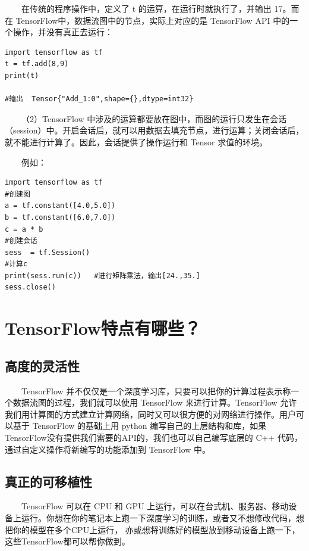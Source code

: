   在传统的程序操作中，定义了 t 的运算，在运行时就执行了，并输出 17。而在
TensorFlow中，数据流图中的节点，实际上对应的是 TensorFlow API
中的一个操作，并没有真正去运行：

\begin{verbatim}
import tensorflow as tf
t = tf.add(8,9)
print(t)

#输出  Tensor{"Add_1:0",shape={},dtype=int32}
\end{verbatim}

  （2）TensorFlow
中涉及的运算都要放在图中，而图的运行只发生在会话（session）中。开启会话后，就可以用数据去填充节点，进行运算；关闭会话后，就不能进行计算了。因此，会话提供了操作运行和
Tensor 求值的环境。

　　例如：

\begin{verbatim}
import tensorflow as tf
#创建图
a = tf.constant([4.0,5.0])
b = tf.constant([6.0,7.0])
c = a * b
#创建会话
sess  = tf.Session()
#计算c
print(sess.run(c))   #进行矩阵乘法，输出[24.,35.]
sess.close()
\end{verbatim}

\section{TensorFlow特点有哪些？}\label{tensorflowux7279ux70b9ux6709ux54eaux4e9b}

\subsection{高度的灵活性}\label{ux9ad8ux5ea6ux7684ux7075ux6d3bux6027}

  TensorFlow
并不仅仅是一个深度学习库，只要可以把你的计算过程表示称一个数据流图的过程，我们就可以使用
TensorFlow 来进行计算。TensorFlow
允许我们用计算图的方式建立计算网络，同时又可以很方便的对网络进行操作。用户可以基于
TensorFlow 的基础上用 python
编写自己的上层结构和库，如果TensorFlow没有提供我们需要的API的，我们也可以自己编写底层的
C++ 代码，通过自定义操作将新编写的功能添加到 TensorFlow 中。

\subsection{真正的可移植性}\label{ux771fux6b63ux7684ux53efux79fbux690dux6027}

  TensorFlow 可以在 CPU 和 GPU
上运行，可以在台式机、服务器、移动设备上运行。你想在你的笔记本上跑一下深度学习的训练，或者又不想修改代码，想把你的模型在多个CPU上运行，
亦或想将训练好的模型放到移动设备上跑一下，这些TensorFlow都可以帮你做到。

